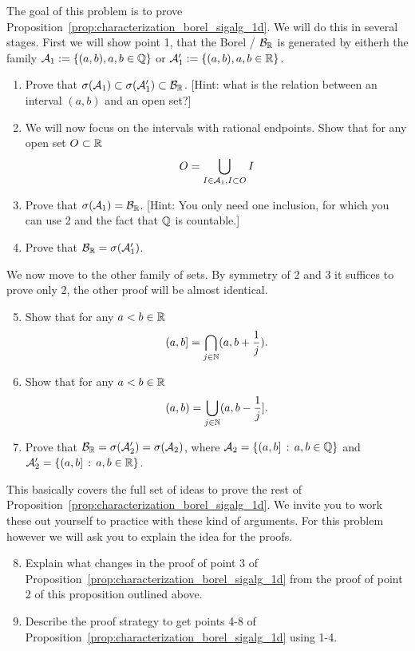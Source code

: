 \begin{problem}\label{prb:borel_sigalg_1d}
The goal of this problem is to prove Proposition~\ref{prop:characterization_borel_sigalg_1d}. We will do this in several stages. First we will show point 1, that the Borel \sigalg/ $\mathcal B_{\mathbb R}$ is generated by eitherh the family $\mathcal A_1 := \{(a, b), a,b \in \mathbb Q\}$ or $\mathcal A_1^\prime := \{(a, b), a,b \in \mathbb R\}$.

\begin{enumerate}
\item Prove that $\sigma(\mathcal A_1) \subset \sigma(\mathcal A_1^\prime) \subset \mathcal B_{\mathbb R}$. [Hint: what is the relation between an interval $(a,b)$ and an open set?]
\item We will now focus on the intervals with rational endpoints. Show that for any open set $O \subset \mathbb R$
\[
	O = \bigcup_{I \in \mathcal A_1, I \subset O} I
\]
\item Prove that $\sigma(\mathcal A_1) = \mathcal B_{\mathbb R}$. [Hint: You only need one inclusion, for which you can use 2 and the fact that $\mathbb Q$ is countable.]
\item Prove that $\mathcal B_{\mathbb R} = \sigma(\mathcal A_1^\prime)$.
\end{enumerate}

We now move to the other family of sets. By symmetry of 2 and 3 it suffices to prove only 2, the other proof will be almost identical.
\begin{enumerate}
\setcounter{enumi}{4}
\item Show that for any $a < b \in \mathbb R$
\[
	(a,b] = \bigcap_{j \in \mathbb N} (a, b+\frac{1}{j}).
\]
\item Show that for any $a < b \in \mathbb R$
\[
	(a,b) = \bigcup_{j \in \mathbb N} (a,b-\frac{1}{j}].
\]
\item Prove that $\mathcal B_{\mathbb R} = \sigma(\mathcal A_2^\prime) = \sigma(\mathcal A_2)$, where $\mathcal A_2 = \{(a,b] \, : \, a,b \in \mathbb Q\}$ and $\mathcal A_2^\prime = \{(a,b] \, : \, a,b \in \mathbb R\}$.
\end{enumerate}

This basically covers the full set of ideas to prove the rest of Proposition~\ref{prop:characterization_borel_sigalg_1d}. We invite you to work these out yourself to practice with these kind of arguments. For this problem however we will ask you to explain the idea for the proofs.
\begin{enumerate}
\setcounter{enumi}{7}
\item Explain what changes in the proof of point 3 of Proposition~\ref{prop:characterization_borel_sigalg_1d} from the proof of point 2 of this proposition outlined above.
\item Describe the proof strategy to get points 4-8 of Proposition~\ref{prop:characterization_borel_sigalg_1d} using 1-4.
\end{enumerate}
\end{problem}

